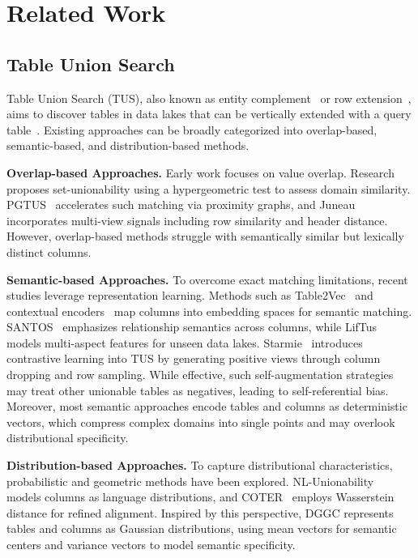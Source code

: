\section{Related Work}
\label{rel_work}

\subsection{\textbf{Table Union Search}}
Table Union Search (TUS), also known as entity complement~\cite{das2012finding} or row extension~\cite{yakout2012infogather}, aims to discover tables in data lakes that can be vertically extended with a query table~\cite{nargesian2018table}. Existing approaches can be broadly categorized into overlap-based, semantic-based, and distribution-based methods. 

\noindent\textbf{Overlap-based Approaches.}
Early work focuses on value overlap. Research~\cite{nargesian2018table} proposes set-unionability using a hypergeometric test to assess domain similarity. PGTUS~\cite{xie2024pgtus} accelerates such matching via proximity graphs, and Juneau~\cite{zhang2019finding} incorporates multi-view signals including row similarity and header distance. However, overlap-based methods struggle with semantically similar but lexically distinct columns.

\noindent\textbf{Semantic-based Approaches.}
To overcome exact matching limitations, recent studies leverage representation learning. Methods such as Table2Vec~\cite{zhang2019table2vec} and contextual encoders~\cite{pilaluisa2024contextual} map columns into embedding spaces for semantic matching. SANTOS~\cite{khatiwada2023santos} emphasizes relationship semantics across columns, while LifTus~\cite{qiu2025liftus} models multi-aspect features for unseen data lakes. 
Starmie~\cite{fan2023starmie} introduces contrastive learning into TUS by generating positive views through column dropping and row sampling. While effective, such self-augmentation strategies may treat other unionable tables as negatives, leading to self-referential bias. Moreover, most semantic approaches encode tables and columns as deterministic vectors, which compress complex domains into single points and may overlook distributional specificity.

\noindent\textbf{Distribution-based Approaches.}
To capture distributional characteristics, probabilistic and geometric methods have been explored. NL-Unionability~\cite{nargesian2018table} models columns as language distributions, and COTER~\cite{yao2023coter} employs Wasserstein distance for refined alignment. Inspired by this perspective, DGGC represents tables and columns as Gaussian distributions, using mean vectors for semantic centers and variance vectors to model semantic specificity.

